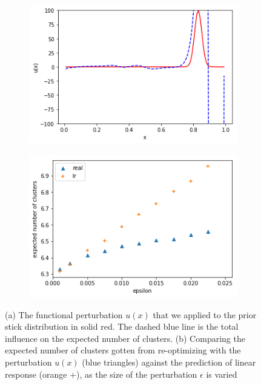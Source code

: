 \documentclass[a4paper]{article}
\begin{document}
\begin{figure}[h!]
	\centering
	\begin{subfigure}[t]{0.4\textwidth}
		\includegraphics[width = \textwidth]{./functional_sensitivity_figs/pert1.png}
		\subcaption{}
	\end{subfigure}
	\begin{subfigure}[t]{0.4\textwidth}
		\includegraphics[width = \textwidth]{./functional_sensitivity_figs/vary_epsilon_e_num_clust.png}
		\subcaption{}
	\end{subfigure}
	\caption{(a) The functional perturbation $u(x)$ that we applied to the prior stick distribution in solid red. The dashed
	blue line is the total influence on the expected number of clusters. (b) Comparing the expected number of clusters gotten from
	re-optimizing with the perturbation $u(x)$ (blue triangles) against the prediction of linear response (orange +), as
	the size of the perturbation $\epsilon$ is varied}
	\label{fig:influence_on_num_clusters}
\end{figure}
\end{document}
